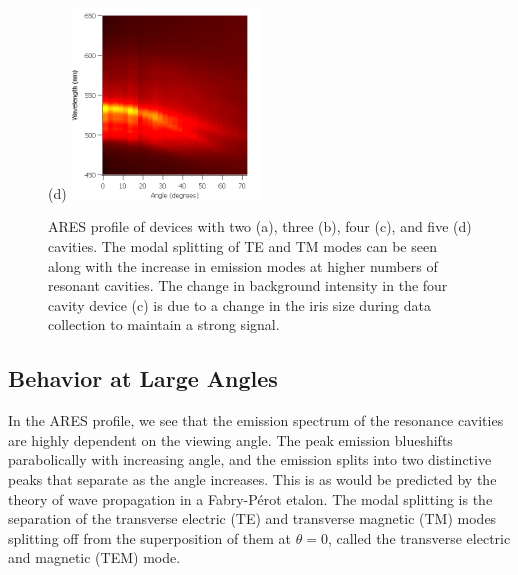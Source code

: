 \documentclass{report}
\begin{document}
\begin{figure}[h!]
            (d)
            \includegraphics[width=0.45\textwidth]{images/n5_heatmap.png}
            \caption{ARES profile of devices with two (a), three (b), four (c), and five (d) cavities. The modal splitting of TE and TM modes can be seen along with the increase in emission modes at higher numbers of resonant cavities. The change in background intensity in the four cavity device (c) is due to a change in the iris size during data collection to maintain a strong signal.}
            \label{fig:heatmaps}
		\end{figure}
    
        \subsection{Behavior at Large Angles} \label{largeAngle}
		In the ARES profile, we see that the emission spectrum of the resonance cavities are highly dependent on the viewing angle. The peak emission blueshifts parabolically with increasing angle, and the emission splits into two distinctive peaks that separate as the angle increases. This is as would be predicted by the theory of wave propagation in a Fabry-P\'erot etalon.\cite{Lim2011} The modal splitting is the separation of the transverse electric (TE) and transverse magnetic (TM) modes splitting off from the superposition of them at $\theta=0$, called the transverse electric and magnetic (TEM) mode. %

    
\end{document}
